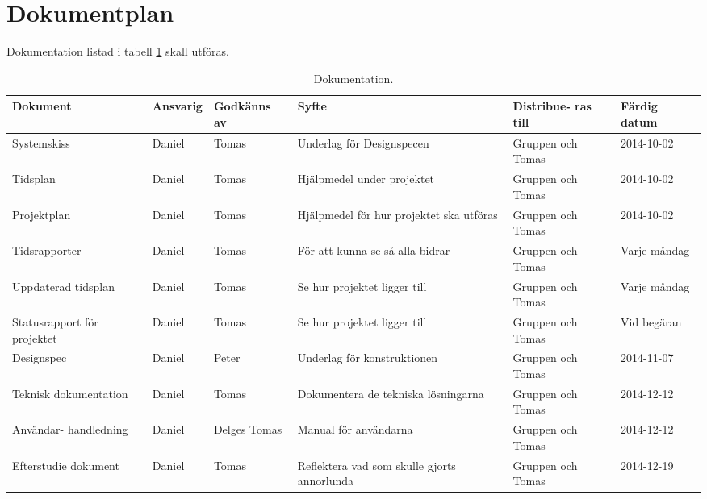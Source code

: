 \section{Dokumentplan}
Dokumentation listad i tabell \ref{dokumentation:tabell} skall utföras.

\begin{table}[h]
	\centering
		\begin{tabularx}{\textwidth}{| p{22mm} | l | X | p{25mm} | X | l |}
			\hline
	\textbf{Dokument} & \textbf{Ansvarig} & \textbf{Godkänns av} & \textbf{Syfte} & \textbf{Distribue-
  ras till} & \textbf{Färdig datum} \\
			\hline

     {Systemskiss} & {Daniel} & {Tomas}& {Underlag för Designspecen} & {Gruppen och Tomas} & {2014-10-02} \\
      \hline
          {Tidsplan} & {Daniel} & {Tomas}& {Hjälpmedel under projektet} & {Gruppen och Tomas} & {2014-10-02} \\
      \hline
          {Projektplan} & {Daniel} & {Tomas}& {Hjälpmedel för hur projektet ska utföras} & {Gruppen och Tomas} & {2014-10-02} \\
      \hline
          {Tidsrapporter} & {Daniel} & {Tomas}& {För att kunna se så alla bidrar} & {Gruppen och Tomas} & {Varje måndag} \\
      \hline
                {Uppdaterad tidsplan} & {Daniel} & {Tomas}& {Se hur projektet ligger till} & {Gruppen och Tomas} & {Varje måndag} \\
      \hline
                      {Statusrapport för projektet} & {Daniel} & {Tomas}& {Se hur projektet ligger till} & {Gruppen och Tomas} & {Vid begäran} \\
      \hline
      
                {Designspec} & {Daniel} & {Peter}& {Underlag för konstruktionen} & {Gruppen och Tomas} & {2014-11-07} \\
      \hline
                      {Teknisk 
                      dokumentation} & {Daniel} & {Tomas}& {Dokumentera de tekniska lösningarna} & {Gruppen och Tomas} & {2014-12-12} \\
      \hline
                            {Användar-
                            handledning} & {Daniel} & {Delges Tomas}& {Manual för användarna} & {Gruppen och Tomas} & {2014-12-12} \\
      \hline
  {Efterstudie
  dokument} & {Daniel} & {Tomas}& {Reflektera vad som skulle gjorts annorlunda} & {Gruppen och Tomas} & {2014-12-19} \\
      \hline
      
		\end{tabularx}
	\caption{Dokumentation.} \label{dokumentation:tabell}
\end{table}